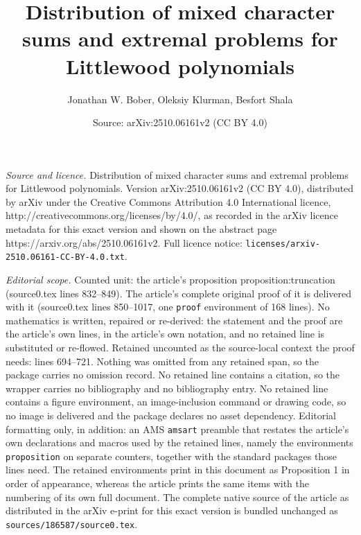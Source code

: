 \documentclass[10pt,a4paper]{amsart}
\title{Distribution of mixed character sums and extremal problems for Littlewood polynomials}
\author{Jonathan W. Bober, Oleksiy Klurman, Besfort Shala}
\date{Source: arXiv:2510.06161v2 (CC BY 4.0)}
\begin{document}
\maketitle

\noindent\emph{Source and licence.} Distribution of mixed character sums and extremal problems for Littlewood polynomials. Version arXiv:2510.06161v2 (CC BY 4.0), distributed by arXiv under the Creative Commons Attribution 4.0 International licence, http://creativecommons.org/licenses/by/4.0/, as recorded in the arXiv licence metadata for this exact version and shown on the abstract page https://arxiv.org/abs/2510.06161v2. Full licence notice: \texttt{licenses/arxiv-2510.06161-CC-BY-4.0.txt}.\par\smallskip

\noindent\textit{Editorial scope.} Counted unit: the article's proposition proposition:truncation (source0.tex lines 832--849). The article's complete original proof of it is delivered with it (source0.tex lines 850--1017, one \texttt{proof} environment of 168 lines). No mathematics is written, repaired or re-derived: the statement and the proof are the article's own lines, in the article's own notation, and no retained line is substituted or re-flowed.  Retained uncounted as the source-local context the proof needs: lines 694--721.  Nothing was omitted from any retained span, so the package carries no omission record.  No retained line contains a citation, so the wrapper carries no bibliography and no bibliography entry.  No retained line contains a figure environment, an image-inclusion command or drawing code, so no image is delivered and the package declares no asset dependency.  Editorial formatting only, in addition: an AMS \texttt{amsart} preamble that restates the article's own declarations and macros used by the retained lines, namely the environments \texttt{proposition} on separate counters, together with the standard packages those lines need.  The retained environments print in this document as Proposition 1 in order of appearance, whereas the article prints the same items with the numbering of its own full document.  The complete native source of the article as distributed in the arXiv e-print for this exact version is bundled unchanged as \texttt{sources/186587/source0.tex}.
\end{document}
